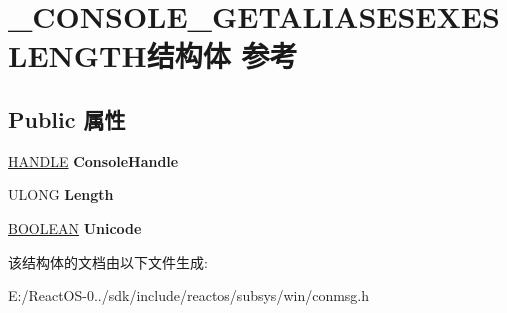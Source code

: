\hypertarget{struct___c_o_n_s_o_l_e___g_e_t_a_l_i_a_s_e_s_e_x_e_s_l_e_n_g_t_h}{}\section{\+\_\+\+C\+O\+N\+S\+O\+L\+E\+\_\+\+G\+E\+T\+A\+L\+I\+A\+S\+E\+S\+E\+X\+E\+S\+L\+E\+N\+G\+T\+H结构体 参考}
\label{struct___c_o_n_s_o_l_e___g_e_t_a_l_i_a_s_e_s_e_x_e_s_l_e_n_g_t_h}
\subsection*{Public 属性}
\begin{DoxyCompactItemize}
\item 
\mbox{\label{struct___c_o_n_s_o_l_e___g_e_t_a_l_i_a_s_e_s_e_x_e_s_l_e_n_g_t_h_a8da897119b4fb41df1196b0e97a460c0}} 
\hyperlink{interfacevoid}{H\+A\+N\+D\+LE} {\bfseries Console\+Handle}
\item 
\mbox{\label{struct___c_o_n_s_o_l_e___g_e_t_a_l_i_a_s_e_s_e_x_e_s_l_e_n_g_t_h_a0f66a3b6ed38097342377a57076655f1}} 
U\+L\+O\+NG {\bfseries Length}
\item 
\mbox{\label{struct___c_o_n_s_o_l_e___g_e_t_a_l_i_a_s_e_s_e_x_e_s_l_e_n_g_t_h_a0cbacabba03176963f315c47ab8df7f9}} 
\hyperlink{_processor_bind_8h_a112e3146cb38b6ee95e64d85842e380a}{B\+O\+O\+L\+E\+AN} {\bfseries Unicode}
\end{DoxyCompactItemize}


该结构体的文档由以下文件生成\+:\begin{DoxyCompactItemize}
\item 
E\+:/\+React\+O\+S-\/0../sdk/include/reactos/subsys/win/conmsg.\+h\end{DoxyCompactItemize}
